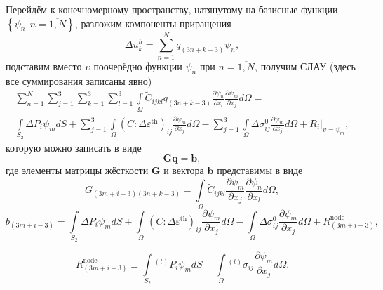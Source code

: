 Перейдём к конечномерному пространству, натянутому на базисные функции $\left\lbrace\psi_{n}|\,n=\overline{1,N}\right\rbrace$, разложим компоненты приращения
\begin{equation}
\Delta u_k^h=\sum_{n=1}^{N}q_{(3n+k-3)}\psi_n,
\label{F:F_alg_var2}
\end{equation}
подставим вместо $\upsilon$ поочерёдно функции $\psi_{n}$ при $n=\overline{1,N}$, получим СЛАУ (здесь все суммирования записаны явно)
\begin{equation}
\begin{gathered}
\sum_{n=1}^{N}\sum_{j=1}^{3}\sum_{k=1}^{3}\sum_{l=1}^{3}
\int\limits_{\Omega}\tilde{C}_{ijkl}q_{(3n+k-3)} \frac{\partial \psi_{n}}{\partial x_{l}} \frac{\partial\psi_{m}}{\partial x_j}d\Omega= \\
\int\limits_{S_{2}}\Delta P_{i}\psi_{m} dS
+\sum_{j=1}^{3}\int\limits_{\Omega}\left(C:\Delta\varepsilon^{\mathrm{th}}\right)_{ij}\frac{\partial\psi_{m}}{\partial x_j}d\Omega
-\sum_{j=1}^{3}\int\limits_{\Omega}\Delta\sigma_{ij}^{0}\frac{\partial\psi_{m}}{\partial x_j}d\Omega+\left.R_{i}\right|_{\upsilon=\psi_{m}},
\end{gathered}
\label{F:F_alg_slau1}
\end{equation}
которую можно записать в виде
\begin{equation}
\mathbf{Gq}=\mathbf{b},
\label{F:F_slau2}
\end{equation}
где элементы матрицы жёсткости $\mathbf{G}$ и вектора $\mathbf{b}$ представимы в виде
\begin{equation}
G_{(3m+i-3)(3n+k-3)}=\int\limits_{\Omega}\tilde{C}_{ijkl}\frac{\partial\psi_{m}}{\partial x_j}\frac{\partial \psi_{n}}{\partial x_{l}}d\Omega,
\label{F:F_slau3}
\end{equation}
\begin{equation}
b_{(3m+i-3)}=
\int\limits_{S_{2}}\Delta P_{i}\psi_{m} dS
+\int\limits_{\Omega}\left(C:\Delta\varepsilon^{\mathrm{th}}\right)_{ij}\frac{\partial\psi_{m}}{\partial x_j}d\Omega
-\int\limits_{\Omega}\Delta\sigma_{ij}^{0}\frac{\partial\psi_{m}}{\partial x_j}d\Omega
+R_{(3m+i-3)}^{\mathrm{node}},
\label{F:F_slau4}
\end{equation}

\begin{equation}
R_{(3m+i-3)}^{\mathrm{node}} \equiv \int\limits_{S_{2}}{}^{(t)}P_{i} \psi_{m} dS - \int\limits_{\Omega}{}^{(t)}\sigma_{ij}\frac{\partial\psi_{m}}{\partial x_j} d\Omega.
\label{F:F_slau4_add}
\end{equation}


